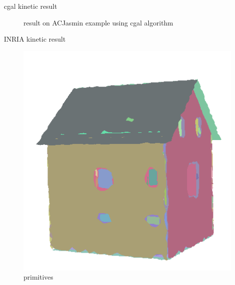 \documentclass[10pt]{beamer}
\begin{document}
\begin{frame}{cgal kinetic result }
\begin{figure}[H]
\begin{minipage}[t]{0.41\textwidth}
            \caption*{result}
          \end{minipage}
          \caption{result on ACJasmin example using cgal algorithm}
      \end{figure}  
\end{frame}
\begin{frame}{INRIA kinetic result }
    \begin{figure}[H]
        \centering
        \begin{minipage}[t]{0.35\textwidth}
          \includegraphics[width=\textwidth]{../../images/screen_kinetic/ACJasmin_primitive.png}
          \caption*{primitives}
        \end{minipage}
        \begin{minipage}[t]{0.35\textwidth}

\end{minipage}
\end{figure}
\end{frame}
\end{document}
